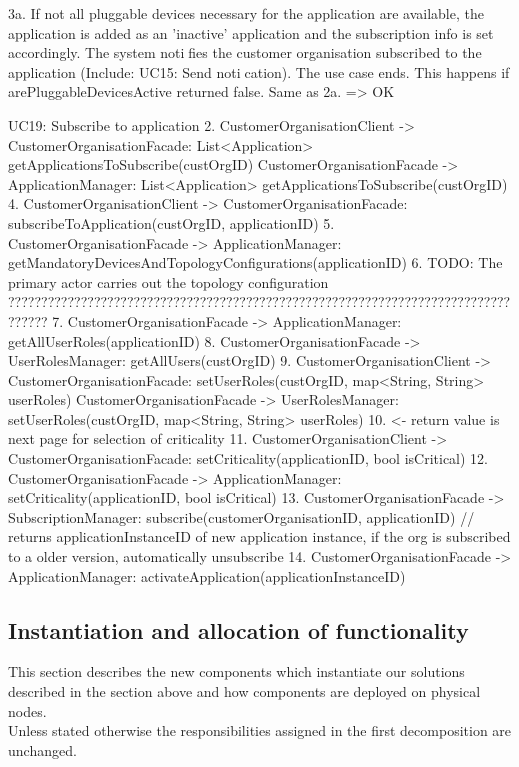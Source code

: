{{{                3a. If not all pluggable devices necessary for the application are available, the application is added
                as an 'inactive' application and the subscription info is set accordingly. The system notifies
                the customer organisation subscribed to the application (Include: UC15: Send notication). The use case ends.
                    This happens if arePluggableDevicesActive returned false.
                    Same as 2a. => OK

        UC19: Subscribe to application
            2. CustomerOrganisationClient -> CustomerOrganisationFacade: List<Application> getApplicationsToSubscribe(custOrgID)
                   CustomerOrganisationFacade -> ApplicationManager: List<Application> getApplicationsToSubscribe(custOrgID)
            4. CustomerOrganisationClient -> CustomerOrganisationFacade: subscribeToApplication(custOrgID, applicationID)
            5. CustomerOrganisationFacade -> ApplicationManager: getMandatoryDevicesAndTopologyConfigurations(applicationID)
            6. TODO: The primary actor carries out the topology configuration ??????????????????????????????????????????????????????????????????????????????????
            7. CustomerOrganisationFacade -> ApplicationManager: getAllUserRoles(applicationID)
            8. CustomerOrganisationFacade -> UserRolesManager: getAllUsers(custOrgID)
            9. CustomerOrganisationClient -> CustomerOrganisationFacade: setUserRoles(custOrgID, map<String, String> userRoles)
                   CustomerOrganisationFacade -> UserRolesManager: setUserRoles(custOrgID, map<String, String> userRoles)
                   10. <- return value is next page for selection of criticality
            11. CustomerOrganisationClient -> CustomerOrganisationFacade: setCriticality(applicationID, bool isCritical)
                    12. CustomerOrganisationFacade -> ApplicationManager: setCriticality(applicationID, bool isCritical)
            13. CustomerOrganisationFacade -> SubscriptionManager: subscribe(customerOrganisationID, applicationID) // returns applicationInstanceID of new application instance, if the org is subscribed to a older version, automatically unsubscribe
            14. CustomerOrganisationFacade -> ApplicationManager: activateApplication(applicationInstanceID)


\subsection{Instantiation and allocation of functionality}
    This section describes the new components which instantiate our solutions described
    in the section above and how components are deployed on physical nodes. \\
    Unless stated otherwise the responsibilities assigned in the first decomposition are unchanged.

}}}

